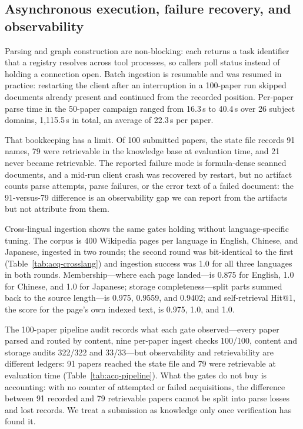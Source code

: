 \subsection{Asynchronous execution, failure recovery, and observability}

Parsing and graph construction are non-blocking: each returns a task
identifier that a registry resolves across tool processes, so callers
poll status instead of holding a connection open. Batch ingestion is
resumable and was resumed in practice: restarting the client after an
interruption in a 100-paper run skipped documents already present and
continued from the recorded position. Per-paper parse time in the
50-paper campaign ranged from 16.3\,s to 40.4\,s over 26 subject
domains, 1{,}115.5\,s in total, an average of 22.3\,s per paper.

That bookkeeping has a limit. Of 100 submitted papers, the state file
records 91 names, 79 were retrievable in the knowledge base at
evaluation time, and 21 never became retrievable. The reported failure
mode is formula-dense scanned documents, and a mid-run client crash was
recovered by restart, but no artifact counts parse attempts, parse
failures, or the error text of a failed document: the 91-versus-79
difference is an observability gap we can report from the artifacts but
not attribute from them.

Cross-lingual ingestion shows the same gates holding without
language-specific tuning. The corpus is 400 Wikipedia pages per language
in English, Chinese, and Japanese, ingested in two rounds; the second
round was bit-identical to the first (Table~\ref{tab:acq-crosslang})
and ingestion success was 1.0 for all three languages in both rounds.
Membership---where each page landed---is 0.875 for English, 1.0 for
Chinese, and 1.0 for Japanese; storage completeness---split parts summed
back to the source length---is 0.975, 0.9559, and 0.9402; and
self-retrieval Hit@1, the score for the page's own indexed text, is
0.975, 1.0, and 1.0.



The 100-paper pipeline audit records what each gate observed---every paper
parsed and routed by content, nine per-paper ingest checks 100/100, content and
storage audits 322/322 and 33/33---but observability and retrievability are
different ledgers: 91 papers reached the state file and 79 were retrievable at
evaluation time (Table~\ref{tab:acq-pipeline}). What the gates do
not buy is accounting: with no counter of attempted or failed
acquisitions, the difference between 91 recorded and 79 retrievable
papers cannot be split into parse losses and lost records. We treat a
submission as knowledge only once verification has found it.
